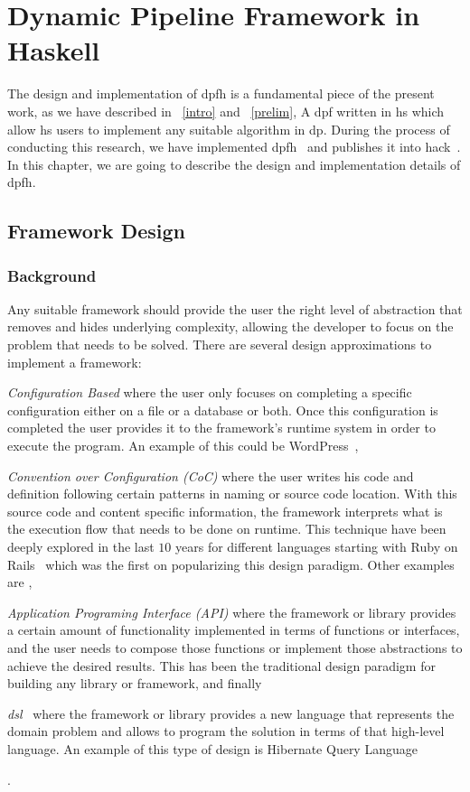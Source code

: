 \chapter{Dynamic Pipeline Framework in Haskell}\label{dp-hs}
The design and implementation of \acrfull{dpfh} is a fundamental piece of the present work, as we have described in ~\autoref{intro} and ~\autoref{prelim},
A \acrlong{dpf} written in \acrlong{hs} which allow \acrshort{hs} users to implement any suitable algorithm in \acrlong{dp}.
During the process of conducting this research, we have implemented \acrshort{dpfh}~\cite{dynamic-pipeline} and publishes it into \acrlong{hack}~\cite{hackage}.
In this chapter, we are going to describe the design and implementation details of \acrshort{dpfh}.

\section{Framework Design}

\subsection{Background}
Any suitable framework should provide the user the right level of abstraction that removes and hides underlying complexity, 
allowing the developer to focus on the problem that needs to be solved.
There are several design approximations to implement a framework: \begin{inparaenum}[i\upshape)]
  \item  \emph{Configuration Based} where the user only focuses on completing a specific configuration either on a file or a database or both. Once this configuration is completed the user provides it to the framework's runtime system in order to execute the program. An example of this could be WordPress~\cite{wordpress},
  \item  \emph{Convention over Configuration (CoC)} where the user writes his code and definition following certain patterns in naming or source code location. With this source code and content specific information, the framework interprets what is the execution flow that needs to be done on runtime. This technique have been deeply explored in the last $10$ years for different languages starting with Ruby on Rails~\cite{rubyonrails} which was the first on popularizing this design paradigm. Other examples are \cite{springboot, cakephp},
  \item \emph{Application Programing Interface (API)} where the framework or library provides a certain amount of functionality implemented in terms of functions or interfaces, and the user needs to compose those functions or implement those abstractions to achieve the desired results. This has been the traditional design paradigm for building any library or framework, and finally
  \item \emph{\acrfull{dsl}}~\cite{Fowler10} where the framework or library provides a new language that represents the domain problem and allows to program the solution in terms of that high-level language. An example of this type of design is Hibernate Query Language~\cite{hql}
   \end{inparaenum}.

